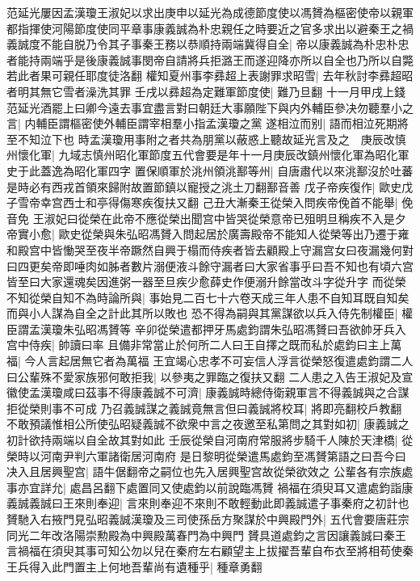 范延光屢因孟漢瓊王淑妃以求出庚申以延光為成德節度使以馮贇為樞密使帝以親軍都指揮使河陽節度使同平章事康義誠為朴忠親任之時要近之官多求出以避秦王之禍義誠度不能自脱乃令其子事秦王務以恭順持兩端冀得自全|{
	帝以康義誠為朴忠朴忠者能持兩端乎是後康義誠事閔帝自請將兵拒潞王而遂迎降亦所以自全也乃所以自斃若此者果可親任耶度徒洛翻}
權知夏州事李彞超上表謝罪求昭雪|{
	去年秋討李彞超昭者明其無它雪者澡洗其罪}
壬戌以彞超為定難軍節度使|{
	難乃旦翻}
十一月甲戌上錢范延光酒罷上曰卿今遠去事宜盡言對曰朝廷大事願陛下與内外輔臣參决勿聽羣小之言|{
	内輔臣謂樞密使外輔臣謂宰相羣小指孟漢瓊之黨}
遂相泣而别|{
	語而相泣死期將至不知泣下也}
時孟漢瓊用事附之者共為朋黨以蔽惑上聽故延光言及之　庚辰改慎州懷化軍|{
	九域志慎州昭化軍節度五代會要是年十一月庚辰改鎮州懷化軍為昭化軍史于此蓋逸為昭化軍四字}
置保順軍於洮州領洮鄯等州|{
	自唐肅代以來洮鄯沒於吐蕃是時必有西戎首領來歸附故置節鎮以寵授之洮土刀翻鄯音善}
戊子帝疾復作|{
	歐史戊子雪帝幸宫西士和亭得傷寒疾復扶又翻}
己丑大漸秦王從榮入問疾帝俛首不能舉|{
	俛音免}
王淑妃曰從榮在此帝不應從榮出聞宫中皆哭從榮意帝已殂明旦稱疾不入是夕帝實小愈|{
	歐史從榮與朱弘昭馮贇入問起居於廣壽殿帝不能知人從榮等出乃遷于雍和殿宫中皆慟哭至夜半帝蹶然自興于榻而侍疾者皆去顧殿上守漏宫女曰夜漏幾何對曰四更矣帝即唾肉如胏者數片溺便液斗餘守漏者曰大家省事乎曰吾不知也有頃六宫皆至曰大家還魂矣因進粥一器至旦疾少愈薛史作便溺升餘當改斗字從升字}
而從榮不知從榮自知不為時論所與|{
	事始見二百七十六卷天成三年人患不自知耳既自知矣而與小人謀為自全之計此其所以敗也}
恐不得為嗣與其黨謀欲以兵入侍先制權臣|{
	權臣謂孟漢瓊朱弘昭馮贇等}
辛卯從榮遣都押牙馬處鈞謂朱弘昭馮贇曰吾欲帥牙兵入宫中侍疾|{
	帥讀曰率}
且備非常當止於何所二人曰王自擇之既而私於處鈞曰主上萬福|{
	今人言起居無它者為萬福}
王宜竭心忠孝不可妄信人浮言從榮怒復遣處鈞謂二人曰公輩殊不愛家族邪何敢拒我|{
	以參夷之罪臨之復扶又翻}
二人患之入告王淑妃及宣徽使孟漢瓊咸曰茲事不得康義誠不可濟|{
	康義誠時總侍衛親軍言不得義誠與之合謀拒從榮則事不可成}
乃召義誠謀之義誠竟無言但曰義誠將校耳|{
	將即亮翻校戶教翻}
不敢預議惟相公所使弘昭疑義誠不欲衆中言之夜邀至私第問之其對如初|{
	康義誠之初計欲持兩端以自全故其對如此}
壬辰從榮自河南府常服將步騎千人陳於天津橋|{
	從榮時以河南尹判六軍諸衛居河南府}
是日黎明從榮遣馬處鈞至馮贇第語之曰吾今曰决入且居興聖宫|{
	語牛倨翻帝之嗣位也先入居興聖宫故從榮欲效之}
公輩各有宗族處事亦宜詳允|{
	處昌呂翻下處置同又使處鈞以前說臨馮贇}
禍福在須臾耳又遣處鈞詣康義誠義誠曰王來則奉迎|{
	言來則奉迎不來則不敢輕動此即義誠遣子事秦府之初計也}
贇馳入右掖門見弘昭義誠漢瓊及三司使孫岳方聚謀於中興殿門外|{
	五代會要唐莊宗同光二年改洛陽崇勲殿為中興殿萬春門為中興門}
贇具道處鈞之言因讓義誠曰秦王言禍福在須臾其事可知公勿以兒在秦府左右顧望主上拔擢吾輩自布衣至將相苟使秦王兵得入此門置主上何地吾輩尚有遺種乎|{
	種章勇翻}
